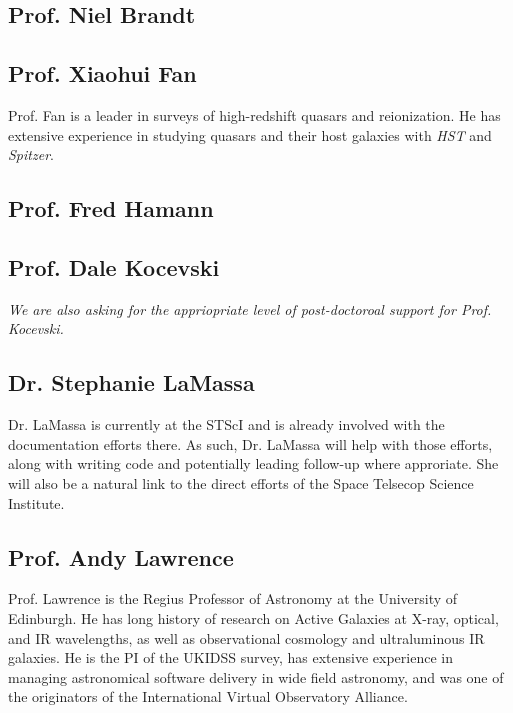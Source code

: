 \iffalse
\subsection*{Prof. Beth Biller}
Prof. Biller is an expert in infrared coronagraphic observations. 
While we do not intend to use the MIRI coronagraphs in this proposal, 
longer term observations would potentially involve observing the ERQs
with the Lyot or 4QPM if this became appropriate and technically feasible. 
\fi

\subsection*{Prof. Niel Brandt}


\subsection*{Prof. Xiaohui Fan}
Prof. Fan is a leader in surveys of high-redshift quasars and
reionization. He has extensive experience in studying quasars and
their host galaxies with {\it HST} and {\it Spitzer}.


\subsection*{Prof. Fred Hamann}


\subsection*{Prof. Dale Kocevski}
{\it We are also asking for the appriopriate level of post-doctoroal support for Prof. Kocevski.}


\iffalse
\subsection*{Prof. Linhua Jiang}
\fi


\subsection*{Dr. Stephanie LaMassa}
Dr. LaMassa is currently at the STScI and is already involved with the
documentation efforts there. As such, Dr. LaMassa will help with those
efforts, along with writing code and potentially leading follow-up
where approriate. She will also be a natural link to the direct
efforts of the Space Telsecop Science Institute.


\subsection*{Prof. Andy Lawrence}
Prof. Lawrence is the Regius Professor of Astronomy at the University
of Edinburgh. He has long history of research on Active Galaxies at
X-ray, optical, and IR wavelengths, as well as observational cosmology
and ultraluminous IR galaxies. He is the PI of the UKIDSS survey, has
extensive experience in managing astronomical software delivery in
wide field astronomy, and was one of the originators of the
International Virtual Observatory Alliance.


